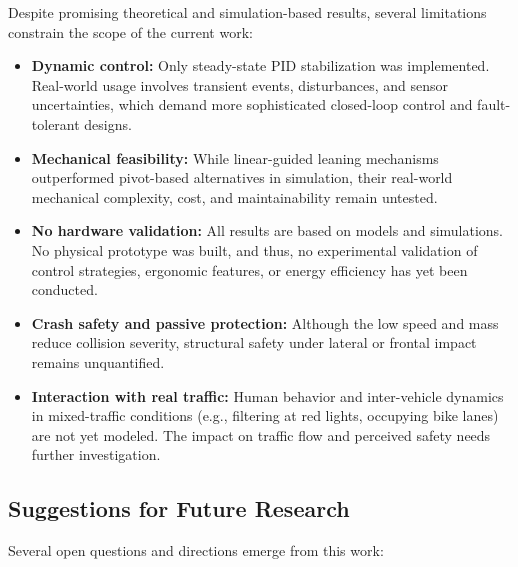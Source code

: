 Despite promising theoretical and simulation-based results, several limitations constrain the scope of the current work:

\begin{itemize}
    \item \textbf{Dynamic control:} Only steady-state PID stabilization was implemented. Real-world usage involves transient events, disturbances, and sensor uncertainties, which demand more sophisticated closed-loop control and fault-tolerant designs.
    \item \textbf{Mechanical feasibility:} While linear-guided leaning mechanisms outperformed pivot-based alternatives in simulation, their real-world mechanical complexity, cost, and maintainability remain untested.
    \item \textbf{No hardware validation:} All results are based on models and simulations. No physical prototype was built, and thus, no experimental validation of control strategies, ergonomic features, or energy efficiency has yet been conducted.
    \item \textbf{Crash safety and passive protection:} Although the low speed and mass reduce collision severity, structural safety under lateral or frontal impact remains unquantified.
    \item \textbf{Interaction with real traffic:} Human behavior and inter-vehicle dynamics in mixed-traffic conditions (e.g., filtering at red lights, occupying bike lanes) are not yet modeled. The impact on traffic flow and perceived safety needs further investigation.
\end{itemize}

\newpage 

\subsection{Suggestions for Future Research}

Several open questions and directions emerge from this work:

